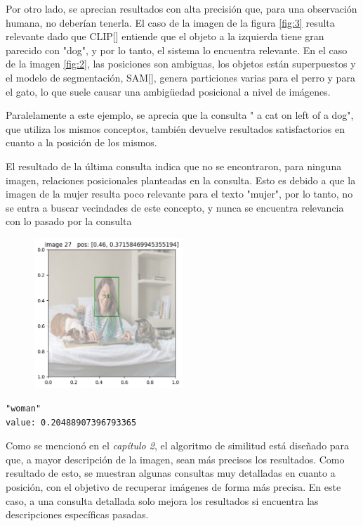 Por otro lado, se aprecian resultados con alta precisión que, para una observación humana, no deberían tenerla. El caso de la imagen de la figura \ref{fig:3} resulta relevante dado que CLIP[\cite{clip}] entiende que el objeto a la izquierda tiene gran parecido con "dog", y por lo tanto, el sistema lo encuentra relevante. En el caso de la imagen \ref{fig:2}, las posiciones son ambiguas, los objetos est\'an superpuestos y el modelo de segmentación, SAM[\cite{sam-paper}], genera particiones varias para el perro y para el gato, lo que suele causar una ambigüedad posicional a nivel de im\'agenes.

Paralelamente a este ejemplo, se aprecia que la consulta " a cat on left of a dog", que utiliza los mismos conceptos, también devuelve resultados satisfactorios en cuanto a la posición de los mismos.

El resultado de la última consulta indica que no se encontraron, para ninguna imagen, relaciones posicionales planteadas en la consulta. Esto es debido a que la imagen de la mujer resulta poco relevante para el texto "mujer", por lo tanto, no se entra a buscar vecindades de este concepto, y nunca se encuentra relevancia con lo pasado por la consulta


\begin{figure}[H]
\centering
 \includegraphics[width=0.5\textwidth]{Graphics/woman.png}
 \caption{ }
 \label{fig:woman}
\end{figure}

\begin{verbatim}
"woman"
value: 0.20488907396793365
\end{verbatim}

Como se mencionó en el \textit{capítulo 2}, el algoritmo de similitud est\'a diseñado para que, a mayor descripción de la imagen, sean m\'as precisos los resultados. Como resultado de esto, se muestran algunas consultas muy detalladas en cuanto a posición, con el objetivo de recuperar im\'agenes de forma m\'as precisa. En este caso, a una consulta detallada solo mejora los resultados si encuentra las descripciones específicas pasadas.

